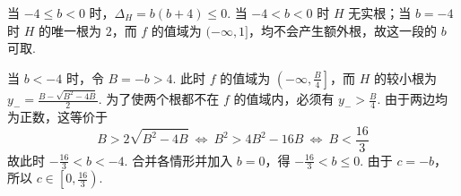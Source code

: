 \begin{solution}
\begin{enumerate}
当 \(-4\leqslant b<0\) 时，\(\Delta_H=b(b+4)\leqslant0\). 当 \(-4<b<0\) 时 \(H\) 无实根；当 \(b=-4\) 时 \(H\) 的唯一根为 \(2\)，而 \(f\) 的值域为 \((-\infty,1]\)，均不会产生额外根，故这一段的 \(b\) 可取.

当 \(b<-4\) 时，令 \(B=-b>4\). 此时 \(f\) 的值域为 \(\left(-\infty,\frac{B}{4}\right]\)，而 \(H\) 的较小根为
\(y_{-}=\frac{B-\sqrt{B^{2}-4B}}{2}\).
为了使两个根都不在 \(f\) 的值域内，必须有 \(y_{-}>\frac{B}{4}\). 由于两边均为正数，这等价于
\[
B>2\sqrt{B^{2}-4B}\ \Longleftrightarrow\ B^{2}>4B^{2}-16B\ \Longleftrightarrow\ B<\frac{16}{3}
\]
故此时 \(-\frac{16}{3}<b<-4\). 合并各情形并加入 \(b=0\)，得
\(-\frac{16}{3}<b\leqslant0\).
由于 \(c=-b\)，所以
\(c\in\left[0,\frac{16}{3}\right)\).
\end{enumerate}
\end{solution}
